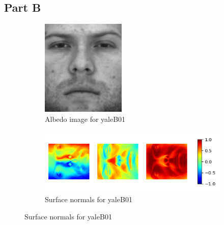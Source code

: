 \documentclass{math}
\begin{document}
\subsection*{Part B}
\begin{figure}[H]
  \begin{subfigure}{0.35\linewidth}
    \centering
    \includegraphics[width=4cm]{assets/hw_03_albedo.png}
    \caption{Albedo image for yaleB01}
  \end{subfigure}
  \begin{subfigure}{0.3\linewidth}
    \centering
    \includegraphics[width=12cm]{assets/hw_03_surface_normals.png}
    \caption{Surface normals for yaleB01}
  \end{subfigure}
\end{figure}
\end{document}
